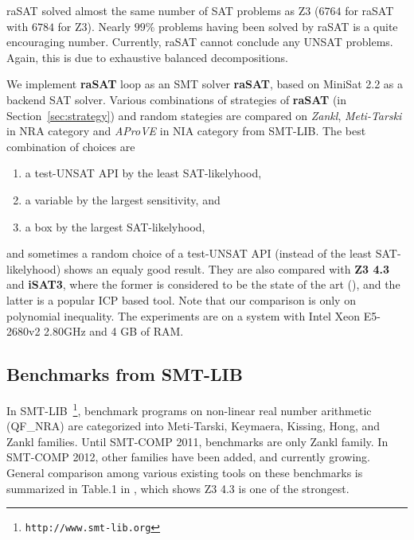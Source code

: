 raSAT solved almost the same number of SAT problems as Z3 ($6764$ for raSAT with $6784$ for Z3). Nearly $99\%$ problems having been solved by raSAT is a quite encouraging number. 
Currently, raSAT cannot conclude any UNSAT problems. Again, this is due to exhaustive balanced decompositions.


We implement \textbf{raSAT} loop as an SMT solver {\bf raSAT}, 
based on MiniSat 2.2 as a backend SAT solver. 
Various combinations of strategies of {\bf raSAT} (in Section~\ref{sec:strategy})
and random stategies are compared on {\em Zankl}, {\em Meti-Tarski} in NRA category 
and {\em AProVE} in NIA category from SMT-LIB. 
The best combination of choices are 
\begin{enumerate}
\item a test-UNSAT API by the least SAT-likelyhood, 
\item a variable by the largest sensitivity, and 
\item a box by the largest SAT-likelyhood, 
\end{enumerate} 
and sometimes a random choice of a test-UNSAT API (instead of the least SAT-likelyhood) 
shows an equaly good result. 
They are also compared with \textbf{Z3 4.3} and \textbf{iSAT3}, 
where the former is considered to be the state of the art (\cite{Jovanovic13}), and 
the latter is a popular ICP based tool. 
Note that our comparison is only on polynomial inequality. 
The experiments are on a system with Intel Xeon E5-2680v2 2.80GHz and 4 GB of RAM. 


\subsection{Benchmarks from SMT-LIB} \label{sec:expsmtlib}

In SMT-LIB~\footnote{\tt http://www.smt-lib.org}, 
benchmark programs on non-linear real number arithmetic 
(QF\_NRA) are categorized into Meti-Tarski, Keymaera, Kissing, Hong, and Zankl families. 
Until SMT-COMP 2011, benchmarks are only Zankl family. 
In SMT-COMP 2012, other families have been added, and currently growing. 
General comparison among various existing tools on these benchmarks is summarized in 
Table.1 in \cite{Jovanovic13}, which shows Z3 4.3 is one of the strongest. 

